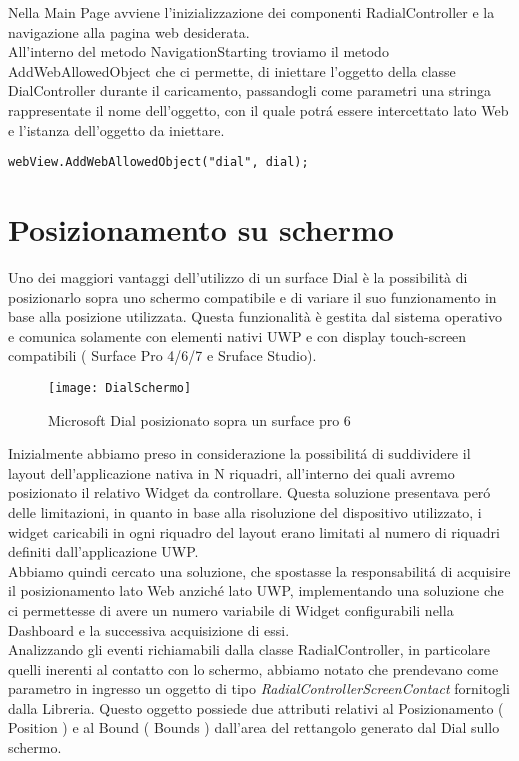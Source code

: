 Nella Main Page avviene l’inizializzazione dei componenti RadialController e la navigazione alla pagina web desiderata.\\

All’interno del metodo NavigationStarting troviamo il metodo AddWebAllowedObject che ci permette, di iniettare l’oggetto della classe DialController durante il caricamento, passandogli come parametri una stringa rappresentate il nome dell'oggetto, con il quale potrá essere intercettato lato Web e l'istanza dell'oggetto da iniettare.

\begin{lstlisting}[caption={Injection oggetto C\#},style=javaScriptCode]
webView.AddWebAllowedObject("dial", dial);
\end{lstlisting}

\section{Posizionamento su schermo}

Uno dei maggiori vantaggi dell’utilizzo di un surface Dial è la possibilità di posizionarlo sopra uno schermo compatibile e di variare il suo funzionamento in base alla posizione utilizzata.
Questa funzionalità è gestita dal sistema operativo e comunica solamente con elementi nativi UWP e con  display touch-screen compatibili ( Surface Pro 4/6/7 e Sruface Studio).

\begin{figure}[htpb!]
  \centering
  \texttt{[image: DialSchermo]}
  \caption{Microsoft Dial posizionato sopra un surface pro 6}
\end{figure}
Inizialmente abbiamo preso in considerazione la possibilitá di suddividere il layout dell’applicazione nativa in N riquadri, all’interno dei quali avremo posizionato il relativo Widget da controllare. Questa soluzione presentava peró delle limitazioni, in quanto in base alla risoluzione del dispositivo utilizzato, i widget caricabili in ogni riquadro del layout erano limitati al numero di riquadri definiti dall'applicazione UWP.\\
Abbiamo quindi cercato una soluzione, che spostasse la responsabilitá di acquisire il posizionamento lato Web anziché lato UWP, implementando una soluzione che ci permettesse di avere un numero variabile di Widget configurabili nella Dashboard e la successiva acquisizione di essi.\\

Analizzando gli eventi richiamabili dalla classe RadialController, in particolare quelli inerenti al contatto con lo schermo, abbiamo notato che prendevano come parametro in ingresso un oggetto di tipo \emph{RadialControllerScreenContact} fornitogli dalla Libreria. 
Questo oggetto possiede due attributi relativi al Posizionamento ( Position ) e al Bound ( Bounds ) dall'area del rettangolo generato dal Dial sullo schermo.

